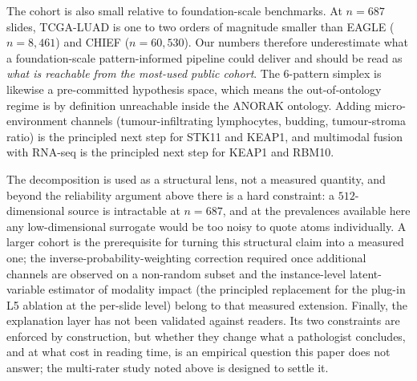 \begin{table}[htbp]
\centering

\caption{Empirical within-domain cohort-transfer result on CPTAC-LUAD
($498$ slides, $106$ genotyped patients): the frozen TCGA-trained
pipeline applied off-the-shelf. Read this way the TCGA verdicts do not
transfer. What fails, however, is the transported decision function and
not the tissue, so no assignment is licensed as near-intrinsic on this
evidence, but neither is the coupling itself cohort-local. The
per-gene values, the aggregator and stain-normalisation controls and the
power caveat are set out below the table.}
\label{tab:cptac_transfer}
\end{table}

The cohort is also small relative to foundation-scale benchmarks.
At $n=687$ slides, TCGA-LUAD is one to two orders of magnitude
smaller than EAGLE ($n=8{,}461$) and CHIEF ($n=60{,}530$).
Our numbers therefore underestimate what a foundation-scale
pattern-informed pipeline could deliver and should be read as
\emph{what is reachable from the most-used public cohort}.
The 6-pattern simplex is likewise a pre-committed hypothesis space,
which means the out-of-ontology regime is by definition unreachable
inside the ANORAK ontology.
Adding micro-environment channels (tumour-infiltrating
lymphocytes,\cite{brambilla2016til} budding,\cite{kadota2015budding}
tumour-stroma ratio\cite{zhang2015tsr}) is the principled next
step for STK11 and KEAP1, and multimodal fusion with RNA-seq is the
principled next step for KEAP1 and RBM10.

The decomposition is used as a structural lens, not a measured quantity,
and beyond the reliability argument above there is a hard constraint: a
$512$-dimensional source is intractable at $n=687$, and at the prevalences
available here any low-dimensional surrogate would be too noisy to quote
atoms individually.
A larger cohort is the prerequisite for turning this structural claim
into a measured one; the inverse-probability-weighting correction
required once additional channels are observed on a non-random
subset\cite{choi2025icym2i} and the instance-level latent-variable
estimator of modality impact\cite{madaan2026primo} (the principled
replacement for the plug-in L5 ablation at the per-slide level) belong
to that measured extension.
Finally, the explanation layer has not been validated against
readers.
Its two constraints are enforced by construction, but whether they
change what a pathologist concludes, and at what cost in reading
time, is an empirical question this paper does not answer; the
multi-rater study noted above is designed to settle it.

